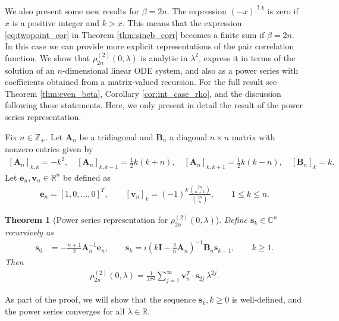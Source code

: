 \documentclass[12pt]{article}
\newtheorem{theorem}{Theorem}
\theoremstyle{definition} %
\newcommand{\Z}{{\mathbb Z}}
\newcommand{\R}{{\mathbb R}}
\newcommand{\CC}{{\mathbb C}}
\theoremstyle{remark} %
\begin{document}
We also present some new results for $\beta=2n$.  
The expression $(-x)^{\uparrow k}$ is zero if $x$ is a positive integer and $k>x$. This means that the expression \eqref{eq:twopoint_cor} in Theorem \ref{thm:sineb_corr} becomes a finite sum if $\beta=2n$. In this case we 
can provide more explicit representations of the pair correlation function.  We show that  $\rho^{(2)}_{2n}(0,\lambda)$ is analytic in $\lambda^2$,  express it in terms of the solution of an $n$-dimensional linear ODE system, and also as a power series with coefficients obtained from a matrix-valued recursion. For the full result see Theorem \ref{thm:even_beta}, Corollary \ref{cor:int_case_rho}, and the discussion following these statements. Here, we only present in detail the result of the power series representation.

Fix $n\in \Z_+$.  
Let $\mathbf{A}_{n}$ be a tridiagonal  and $\mathbf{B}_n$ a diagonal $n\times n$ matrix with nonzero entries given by 
\begin{align}\label{eq:AB}
      [\mathbf{A}_n]_{k,k}=-k^2, \quad [\mathbf{A}_n]_{k,k-1}=\frac12 k(k+n), \quad [\mathbf{A}_n]_{k,k+1}=\frac12 k(k-n),\quad [\mathbf{B}_n]_k=k.
\end{align}
Let $\mathbf{e}_n, \mathbf{v}_n\in \R^n$ be defined as 
\begin{align}\label{eq:vectors}\mathbf{e}_n=[1,0,\dots,0]^T, \qquad 
[\mathbf{v}_n]_k=(-1)^k\frac{ \binom{2n}{n+k}}{\binom{2n}{n}}, \qquad 1\le k\le n.
\end{align}

\begin{theorem}[Power series representation for $\rho_{2n}^{(2)}(0,\lambda)$]\label{thm:sineb_series}
Define $\mathbf{s}_k \in \CC^n$ recursively as
\begin{align}\label{eq:q_coeff}
    \mathbf{s}_0&=-\frac{n+1}{2}\mathbf{A}_n^{-1}\mathbf{e}_n, \qquad \mathbf{s}_k=i \left(k \mathbf{I}-\tfrac{2}{n} \mathbf{A}_n\right)^{-1} \mathbf{B}_n \mathbf{s}_{k-1}, \qquad k\ge 1.
\end{align}
Then 
\begin{align}\label{eq:rho2_2n}
    \rho_{2n}^{(2)}(0,\lambda)=\frac{1}{2\pi^2} \sum_{j=1}^\infty \mathbf{v}_n^{T} \cdot \mathbf{s}_{2j}\,  \lambda^{2j}.
\end{align}    
\end{theorem}
As part of the proof, we will show that the sequence $\mathbf{s}_k, k\ge 0$ is well-defined, and the power series converges for all $\lambda\in \R$. 
\end{document}
